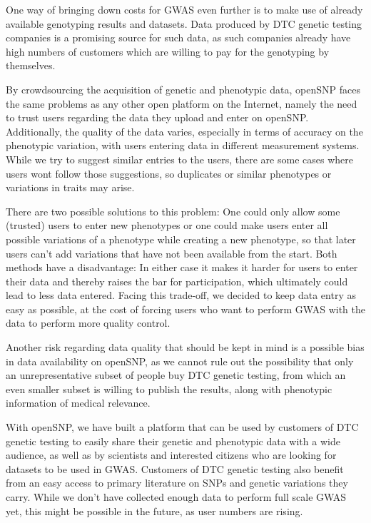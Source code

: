 \documentclass[10pt]{article}
\begin{document}
One way of bringing down costs for GWAS even further is to make use of already available genotyping results and datasets. 
Data produced by DTC genetic testing companies is a promising source for such data, as such companies already have high 
numbers of customers which are willing to pay for the genotyping by themselves.

By crowdsourcing the acquisition of genetic and phenotypic data, openSNP faces the same problems as any other 
open platform on the Internet, namely the need to trust users regarding the data they upload and enter on openSNP. 
Additionally, the quality of the data varies, especially in terms of accuracy on the phenotypic variation, 
with users entering data in different measurement systems. While we try to suggest similar entries to the users, 
there are some cases where users wont follow those suggestions, so duplicates or similar phenotypes or variations in traits may arise. 

There are two possible solutions to this problem: One could only allow some (trusted) users to enter new phenotypes or one 
could make users enter all possible variations of a phenotype while creating a new phenotype, so that later users can't add 
variations that have not been available from the start. Both methods have a disadvantage: In either case it makes it harder 
for users to enter their data and thereby raises the bar for participation, which ultimately could lead to less data entered. 
Facing this trade-off, we decided to keep data entry as easy as possible, at the cost of forcing users who want to perform GWAS 
with the data to perform more quality control.

Another risk regarding data quality that should be kept in mind is a possible bias in data availability on openSNP, as we cannot 
rule out the possibility that only an unrepresentative subset of people buy DTC genetic testing, from which an even smaller subset 
is willing to publish the results, along with phenotypic information of medical relevance.

With openSNP, we have built a platform that can be used by customers of DTC genetic testing to easily share their genetic and phenotypic 
data with a wide audience, as well as by scientists and interested citizens who are looking for datasets to be used in GWAS. 
Customers of DTC genetic testing also benefit from an easy access to primary literature on SNPs and genetic variations they carry. 
While we don't have collected enough data to perform full scale GWAS yet, this might be possible in the future, as user numbers are rising. 
\end{document}
